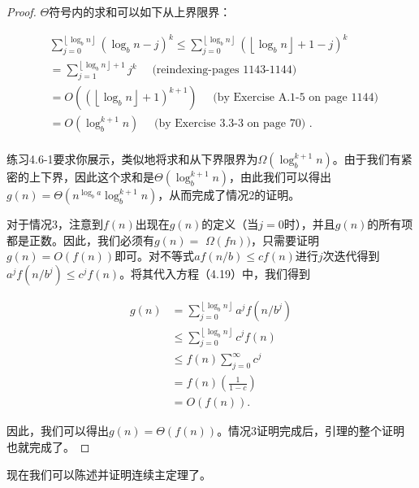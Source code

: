 \documentclass[lang=cn,newtx,10pt,scheme=chinese]{elegantbook}
\begin{document}
\begin{proof}
$\Theta$符号内的求和可以如下从上界限界：

$$
\begin{aligned}
& \sum_{j=0}^{\left\lfloor\log _b n\right\rfloor}\left(\log _b n-j\right)^k \leq \sum_{j=0}^{\left\lfloor\log _b n\right\rfloor}\left(\left\lfloor\log _b n\right\rfloor+1-j\right)^k \\
& =\sum_{j=1}^{\left\lfloor\log _b n\right\rfloor+1} j^k \quad \text { (reindexing-pages 1143-1144) } \\
& =O\left(\left(\left\lfloor\log _b n\right\rfloor+1\right)^{k+1}\right) \quad \text { (by Exercise A.1-5 on page 1144) } \\
& =O\left(\log _b^{k+1} n\right) \quad \text { (by Exercise 3.3-3 on page 70) . } \\
&
\end{aligned}
$$

练习4.6-1要求你展示，类似地将求和从下界限界为$\Omega\left(\log _b^{k+1} n\right)$。由于我们有紧密的上下界，因此这个求和是$\Theta\left(\log _b^{k+1} n\right)$，由此我们可以得出$g(n)=\Theta\left(n^{\log _b a} \log _b^{k+1} n\right)$，从而完成了情况2的证明。

对于情况3，注意到$f(n)$出现在$g(n)$的定义（当$j=0$时），并且$g(n)$的所有项都是正数。因此，我们必须有$g(n)=$ $\Omega(f n))$，只需要证明$g(n)=O(f(n))$即可。对不等式$a f(n / b) \leq c f(n)$进行$j$次迭代得到$a^j f\left(n / b^j\right) \leq c^j f(n)$。将其代入方程（4.19）中，我们得到

$$
\begin{aligned}
g(n) & =\sum_{j=0}^{\left\lfloor\log _b n\right\rfloor} a^j f\left(n / b^j\right) \\
& \leq \sum_{j=0}^{\left\lfloor\log _b n\right\rfloor} c^j f(n) \\
& \leq f(n) \sum_{j=0}^{\infty} c^j \\
& =f(n)\left(\frac{1}{1-c}\right) \\
& =O(f(n)) .
\end{aligned}
$$

因此，我们可以得出$g(n)=\Theta(f(n))$。情况3证明完成后，引理的整个证明也就完成了。
\end{proof}

现在我们可以陈述并证明连续主定理了。
\end{document}
